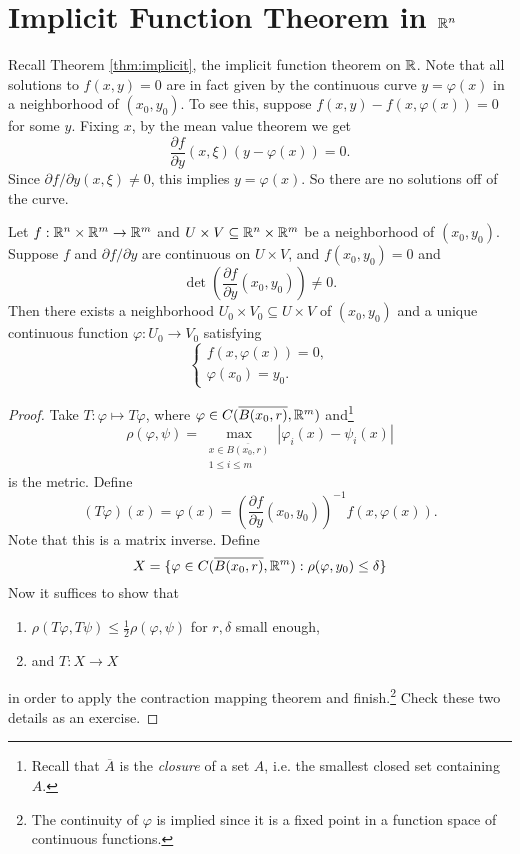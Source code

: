 \section{Implicit Function Theorem in \texorpdfstring{$\mathbb{R}^n$}{Rn}}

\begin{remark}
  Recall Theorem \ref{thm:implicit}, the implicit function
  theorem on $\mathbb{R}$. Note that all solutions to $f(x, y) = 0$
  are in fact given by the continuous curve $y = \varphi(x)$
  in a neighborhood of $(x_0, y_0)$. To see this,
  suppose $f(x, y) - f(x, \varphi(x)) = 0$ for some $y$.
  Fixing $x$, by the mean value theorem we get
  \[
    \frac{\partial f}{\partial y}(x, \xi) (y - \varphi(x))
    = 0.
  \]
  Since $\partial f / \partial y(x, \xi) \ne 0$, this implies $y = \varphi(x)$.
  So there are no solutions off of the curve.
\end{remark}

\begin{theorem}
  \label{thm:implicit-higher-dim}
  Let $f : \mathbb{R}^n \times \mathbb{R}^m \to \mathbb{R}^m$ and
  $U \times V \subseteq \mathbb{R}^n \times \mathbb{R}^m$ be a neighborhood
  of $(x_0, y_0)$. Suppose $f$ and $\partial f / \partial y$
  are continuous on $U \times V$, and $f(x_0, y_0) = 0$ and
  \[
    \det \left( \frac{\partial f}{\partial y}(x_0, y_0) \right) \ne 0.
  \]
  Then there exists a neighborhood $U_0 \times V_0 \subseteq U \times V$
  of $(x_0, y_0)$ and a unique continuous function
  $\varphi : U_0 \to V_0$ satisfying
  \[
  \begin{cases}
    f(x, \varphi(x)) = 0, \\
    \varphi(x_0) = y_0.
  \end{cases}
  \]
\end{theorem}

\begin{proof}
  Take $T : \varphi \mapsto T\varphi$, where
  $\varphi \in C(\overline{B(x_0, r)}, \mathbb{R}^m)$ and\footnote{Recall that $\overline{A}$ is the \emph{closure} of a set $A$, i.e. the smallest closed set containing $A$.}
  \[
    \rho(\varphi, \psi) = \max_{\substack{x \in \overline{B(x_0, r)} \\ 1 \le i \le m}} |\varphi_i(x) - \psi_i(x)|
  \]
  is the metric.
  Define
  \[
    (T\varphi)(x) = \varphi(x) = \left( \frac{\partial f}{\partial y}(x_0, y_0) \right)^{-1} f(x, \varphi(x)).
  \]
  Note that this is a matrix inverse.
  Define
  \[
    X = \{
      \varphi \in C(\overline{B(x_0, r)}, \mathbb{R}^m)
      : \rho(\varphi, y_0) \le \delta
    \}
  \]
  Now it suffices to show that
  \begin{enumerate}
    \item $\rho(T\varphi, T\psi) \le \frac{1}{2} \rho(\varphi, \psi)$ for $r, \delta$ small enough,
    \item and $T : X \to X$
  \end{enumerate}
  in order to apply the contraction mapping theorem and
  finish.\footnote{The continuity of $\varphi$ is implied since it is a fixed point in a function space of continuous functions.} Check these two details as an exercise.
\end{proof}

